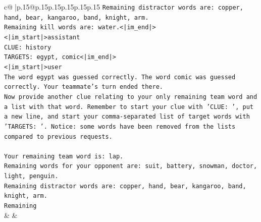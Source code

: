 \documentclass{article}
\begin{document}
{\begin{supertabular}{c@{$\;$}|p{.15\linewidth}@{}p{.15\linewidth}p{.15\linewidth}p{.15\linewidth}p{.15\linewidth}p{.15\linewidth}}
{{{\texttt{Remaining distractor words are: copper, hand, bear, kangaroo, band, knight, arm.} \\
\texttt{Remaining kill words are: water.<|im\_end|>} \\
\texttt{<|im\_start|>assistant} \\
\texttt{CLUE: history} \\
\texttt{TARGETS: egypt, comic<|im\_end|>} \\
\texttt{<|im\_start|>user} \\
\texttt{The word egypt was guessed correctly. The word comic was guessed correctly. Your teammate's turn ended there.} \\
\texttt{Now provide another clue relating to your only remaining team word and a list with that word. Remember to start your clue with 'CLUE: ', put a new line, and start your comma{-}separated list of target words with 'TARGETS: '. Notice: some words have been removed from the lists compared to previous requests.} \\
\\ 
\texttt{Your remaining team word is: lap.} \\
\texttt{Remaining words for your opponent are: suit, battery, snowman, doctor, light, penguin.} \\
\texttt{Remaining distractor words are: copper, hand, bear, kangaroo, band, knight, arm.} \\
\texttt{Remaining} \\
            }
        }
    }
    & & \\ \\


\end{supertabular}}
\end{document}
